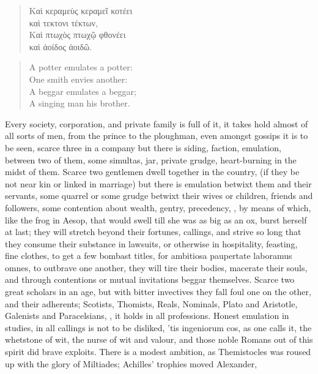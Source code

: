 {\begin{verse}
\textgreek[variant=ancient]{Καὶ κεραμεὺς κεραμεῖ κοτέει\\
καὶ τεκτονι τέκτων},\\
\textgreek[variant=ancient]{Καὶ πτωχὸς πτωχῷ φθονέει\\
καὶ ἀοίδος ἀοιδῶ.}
\end{verse}

\begin{verse}
A potter emulates a potter:\\
One smith envies another:\\

A beggar emulates a beggar;\\
A singing man his brother.\\
\end{verse}

Every society, corporation, and private family is full of it, it takes
hold almost of all sorts of men, from the prince to the ploughman, even
amongst gossips it is to be seen, scarce three in a company but there
is siding, faction, emulation, between two of them, some simultas, jar,
private grudge, heart-burning in the midst of them. Scarce two
gentlemen dwell together in the country, (if they be not near kin or
linked in marriage) but there is emulation betwixt them and their
servants, some quarrel or some grudge betwixt their wives or children,
friends and followers, some contention about wealth, gentry,
precedency, \etc{}, by means of which, like the frog in Aesop, that
would swell till she was as big as an ox, burst herself at last; they
will stretch beyond their fortunes, callings, and strive so long that
they consume their substance in lawsuits, or otherwise in hospitality,
feasting, fine clothes, to get a few bombast titles, for ambitiosa
paupertate laboramus omnes, to outbrave one another, they will tire
their bodies, macerate their souls, and through contentions or mutual
invitations beggar themselves. Scarce two great scholars in an age, but
with bitter invectives they fall foul one on the other, and their
adherents; Scotists, Thomists, Reals, Nominals, Plato and Aristotle,
Galenists and Paracelsians, \etc{}, it holds in all professions.
Honest emulation in studies, in all callings is not to be
disliked, 'tis ingeniorum cos, as one calls it, the whetstone of wit,
the nurse of wit and valour, and those noble Romans out of this spirit
did brave exploits. There is a modest ambition, as Themistocles was
roused up with the glory of Miltiades; Achilles' trophies moved
Alexander,

}
